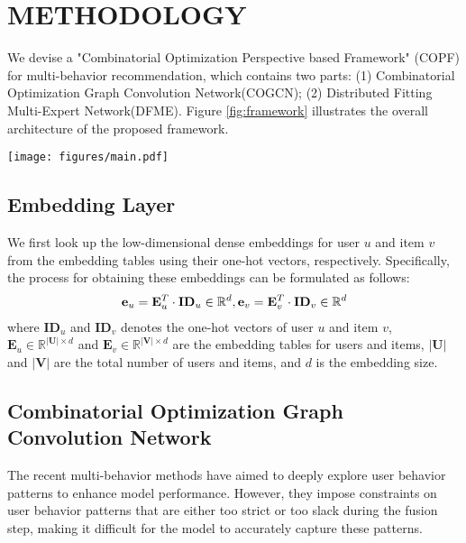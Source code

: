 \section{METHODOLOGY}
We devise a "Combinatorial Optimization Perspective based Framework" (COPF) for multi-behavior recommendation, which contains two parts: (1) Combinatorial Optimization Graph Convolution Network(COGCN); (2) Distributed Fitting Multi-Expert Network(DFME). Figure \ref{fig:framework} illustrates the overall architecture of the proposed framework.

\begin{figure*}[t]
	\centering
	\setlength{\belowcaptionskip}{-0.0cm}
	\setlength{\abovecaptionskip}{-0.0cm}
	\texttt{[image: figures/main.pdf]}
	\caption{Illustration of the proposed COPF framework, and we use three user behavior types as examples: view, cart, and buy. ($\oplus$) denotes the element-wise addition operation, $f(\cdot)$ represents the function to generate experts, and dotted lines represent stop gradient.}
	\label{fig:framework}
	\vspace{-4mm}
\end{figure*}

\subsection{Embedding Layer}
We first look up the low-dimensional dense embeddings for user $u$ and item $v$ from the embedding tables using their one-hot vectors, respectively. Specifically, the process for obtaining these embeddings can be formulated as follows:
\begin{equation}
\begin{aligned}
\mathbf{e}_{u}=\mathbf{E}_{u}^{T}\cdot\mathbf{ID}_{u} \in \mathbb{R}^{d}, \mathbf{e}_{v}=\mathbf{E}_{v}^{T}\cdot\mathbf{ID}_{v} \in \mathbb{R}^{d}
\end{aligned}
\vspace{-0.1mm}
\end{equation}
where $\mathbf{ID}_{u}$ and $\mathbf{ID}_{v}$ denotes the one-hot vectors of user $u$ and item $v$, $\mathbf{E}_u \in \mathbb{R}^{|\mathbf{U}| \times d}$ and $\mathbf{E}_v \in \mathbb{R}^{|\mathbf{V}| \times d}$ are the embedding tables for users and items, $|\mathbf{U}|$ and $|\mathbf{V}|$ are the total number of users and items, and $d$ is the embedding size.

\subsection{Combinatorial Optimization Graph Convolution Network}
The recent multi-behavior methods have aimed to deeply explore user behavior patterns to enhance model performance. However, they impose constraints on user behavior patterns that are either too strict or too slack during the fusion step, making it difficult for the model to accurately capture these patterns. 

